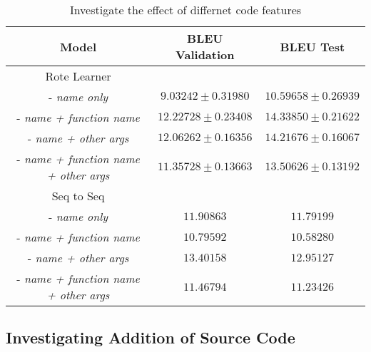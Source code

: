 \begin{table}[h!]
\begin{center}
\begin{tabular}{ c | c | c }
    Model                               & BLEU Validation            & BLEU Test  \\
    \hline
    \hline
    Rote Learner                        &                  & \\    
    - \textit{name only}                & $ 9.03242  \pm  0.31980 $ & $ 10.59658 \pm 0.26939 $  \\
    - \textit{name + function name}     & $ 12.22728 \pm  0.23408 $ & $ 14.33850 \pm 0.21622 $  \\
    - \textit{name + other args}        & $ 12.06262 \pm  0.16356 $ & $ 14.21676 \pm 0.16067 $  \\
    - \textit{name + function name + other args}  & $ 11.35728 \pm  0.13663 $ & $ 13.50626 \pm 0.13192 $ \\
    \hline
    \hline
    Seq to Seq                          &                  & \\
    - \textit{name only}                & $ 11.90863 $ & $ 11.79199 $ \\
    - \textit{name + function name}     & $ 10.79592 $ & $ 10.58280 $  \\
    - \textit{name + other args}        & $ 13.40158 $ & $ 12.95127 $\\
    - \textit{name + function name + other args}  & $ 11.46794 $ & $ 11.23426 $  \\
    \hline
\end{tabular}
\caption {Investigate the effect of differnet code features}
\label{table:tokenization}
\end{center}
\end{table}





\subsection{Investigating Addition of Source Code} %
\label{subs:investigating_tokenizations_with_source_code}

